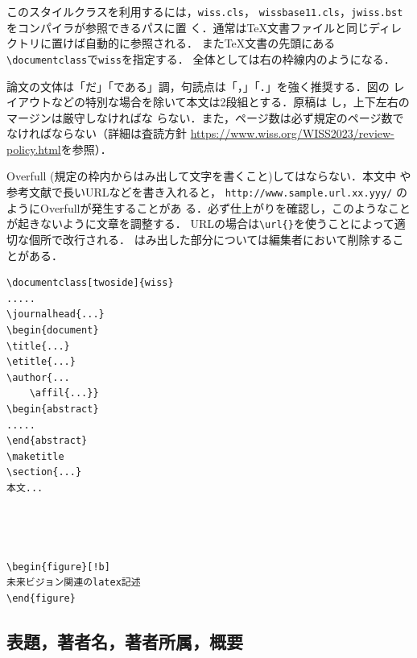 \documentclass[twoside]{wiss}
\begin{document}
このスタイルクラスを利用するには，\verb|wiss.cls|，
\verb|wissbase11.cls|，\verb|jwiss.bst|をコンパイラが参照できるパスに置
く．通常は\TeX 文書ファイルと同じディレクトリに置けば自動的に参照される．
また\TeX 文書の先頭にある\verb|\documentclass|で\verb|wiss|を指定する．
全体としては右の枠線内のようになる．

論文の文体は「だ」「である」調，句読点は「，」「．」を強く推奨する．図の
レイアウトなどの特別な場合を除いて本文は2段組とする．原稿は
し，上下左右のマージンは厳守しなければな
らない．また，ページ数は必ず規定のページ数でなければならない（詳細は査読方針 \url{https://www.wiss.org/WISS2023/review-policy.html}を参照）．

Overfull (規定の枠内からはみ出して文字を書くこと)してはならない．本文中
や参考文献で長いURLなどを書き入れると，
\verb|http://www.sample.url.xx.yyy/| のようにOverfullが発生することがあ
る．必ず仕上がりを確認し，このようなことが起きないように文章を調整する．
URLの場合は\verb|\url{}|を使うことによって適切な個所で改行される．
はみ出した部分については編集者において削除することがある．

\begin{screen}
\begin{verbatim}
\documentclass[twoside]{wiss}
.....
\journalhead{...}
\begin{document}
\title{...}
\etitle{...}
\author{...
    \affil{...}}
\begin{abstract}
.....
\end{abstract}
\maketitle
\section{...}
本文...




\begin{figure}[!b]
未来ビジョン関連のlatex記述
\end{figure}
\end{verbatim}
\end{screen}



\subsection{表題，著者名，著者所属，概要}
\end{document}
